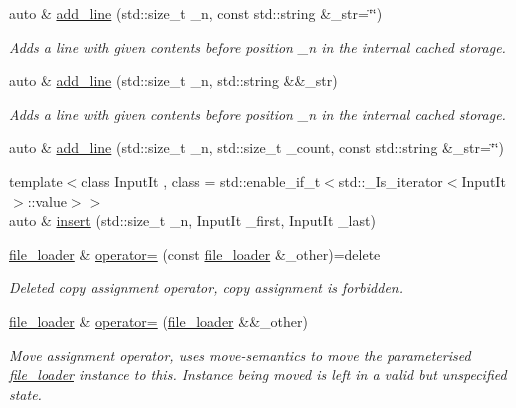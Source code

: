 \begin{DoxyCompactItemize}
auto \& \hyperlink{classcrsc_1_1file__loader_a503965d0fd22de3e4e44f14ae914ca2b}{add\+\_\+line} (std\+::size\+\_\+t \+\_\+n, const std\+::string \&\+\_\+str=\char`\"{}\char`\"{})
\begin{DoxyCompactList}\small\item\em Adds a line with given contents before position \+\_\+n in the internal cached storage. \end{DoxyCompactList}\item 
auto \& \hyperlink{classcrsc_1_1file__loader_a6644e95b299d45b3475b92aadeef133d}{add\+\_\+line} (std\+::size\+\_\+t \+\_\+n, std\+::string \&\&\+\_\+str)
\begin{DoxyCompactList}\small\item\em Adds a line with given contents before position \+\_\+n in the internal cached storage. \end{DoxyCompactList}\item 
auto \& \hyperlink{classcrsc_1_1file__loader_acb535c1b5f6080948a844fd185068aaf}{add\+\_\+line} (std\+::size\+\_\+t \+\_\+n, std\+::size\+\_\+t \+\_\+count, const std\+::string \&\+\_\+str=\char`\"{}\char`\"{})
\item 
{\footnotesize template$<$class Input\+It , class  = std\+::enable\+\_\+if\+\_\+t$<$std\+::\+\_\+\+Is\+\_\+iterator$<$\+Input\+It$>$\+::value$>$$>$ }\\auto \& \hyperlink{classcrsc_1_1file__loader_aeef33f6a6c284974f2635cdcb31f7b24}{insert} (std\+::size\+\_\+t \+\_\+n, Input\+It \+\_\+first, Input\+It \+\_\+last)
\item 
\hyperlink{classcrsc_1_1file__loader}{file\+\_\+loader} \& \hyperlink{classcrsc_1_1file__loader_ac9a181e9ff8455ad47d1dbea84c8f1bf}{operator=} (const \hyperlink{classcrsc_1_1file__loader}{file\+\_\+loader} \&\+\_\+other)=delete
\begin{DoxyCompactList}\small\item\em Deleted copy assignment operator, copy assignment is forbidden. \end{DoxyCompactList}\item 
\hyperlink{classcrsc_1_1file__loader}{file\+\_\+loader} \& \hyperlink{classcrsc_1_1file__loader_a15988c765c8b74376cf65cc62a0280ba}{operator=} (\hyperlink{classcrsc_1_1file__loader}{file\+\_\+loader} \&\&\+\_\+other)
\begin{DoxyCompactList}\small\item\em Move assignment operator, uses move-\/semantics to move the parameterised \hyperlink{classcrsc_1_1file__loader}{file\+\_\+loader} instance to this. Instance being moved is left in a valid but unspecified state. \end{DoxyCompactList}\end{DoxyCompactItemize}
